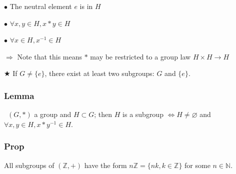                    $\bullet$ The neutral element $e$ is in $H$

                    $\bullet$ $\forall x,y \in H, x \ast y \in H$

                    $\bullet$ $\forall x \in H, x^{-1} \in H$

                    \vspace{5pt}

                    $\Rightarrow$ Note that this means $\ast$ may be restricted to a group law $H \times H \rightarrow H$

                    \vspace{5pt}

                    $\bigstar$ If $G \neq \{e\}$, there exist at least two subgroups: $G$ and $\{e\}$.
                    
            \subsubsection{Lemma}\
                $(G, \ast )$ a group and $H \subset G$; then $H$ is a subgroup $\Leftrightarrow H \neq \varnothing$ and $\forall x,y \in H, x \ast y^{-1} \in H$.

            \subsubsection{Prop}
                All subgroups of $(\mathbb{Z}, +)$ have the form $n\mathbb{Z} = \{nk, k \in \mathbb{Z}\}$ for some $n \in \mathbb{N}$.